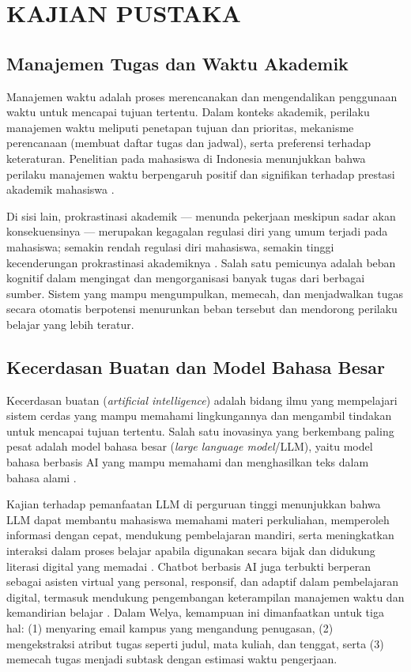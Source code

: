 \chapter{KAJIAN PUSTAKA}

\section{Manajemen Tugas dan Waktu Akademik}
Manajemen waktu adalah proses merencanakan dan mengendalikan penggunaan
waktu untuk mencapai tujuan tertentu. Dalam konteks akademik, perilaku
manajemen waktu meliputi penetapan tujuan dan prioritas, mekanisme
perencanaan (membuat daftar tugas dan jadwal), serta preferensi terhadap
keteraturan. Penelitian pada mahasiswa di Indonesia menunjukkan bahwa
perilaku manajemen waktu berpengaruh positif dan signifikan terhadap
prestasi akademik mahasiswa \parencite{kamilatunnisa2025}.

Di sisi lain, prokrastinasi akademik --- menunda pekerjaan meskipun sadar
akan konsekuensinya --- merupakan kegagalan regulasi diri yang umum
terjadi pada mahasiswa; semakin rendah regulasi diri mahasiswa, semakin
tinggi kecenderungan prokrastinasi akademiknya \parencite{fadila2024}. Salah
satu pemicunya adalah beban kognitif dalam
mengingat dan mengorganisasi banyak tugas dari berbagai sumber. Sistem
yang mampu mengumpulkan, memecah, dan menjadwalkan tugas secara otomatis
berpotensi menurunkan beban tersebut dan mendorong perilaku belajar yang
lebih teratur.

\section{Kecerdasan Buatan dan Model Bahasa Besar}
Kecerdasan buatan (\emph{artificial intelligence}) adalah bidang ilmu yang
mempelajari sistem cerdas yang mampu memahami lingkungannya dan mengambil
tindakan untuk mencapai tujuan tertentu. Salah satu inovasinya yang
berkembang paling pesat adalah model bahasa besar (\emph{large language
model}/LLM), yaitu model bahasa berbasis AI yang mampu memahami dan
menghasilkan teks dalam bahasa alami \parencite{johan2026}.

Kajian terhadap pemanfaatan LLM di perguruan tinggi menunjukkan bahwa LLM
dapat membantu mahasiswa memahami materi perkuliahan, memperoleh
informasi dengan cepat, mendukung pembelajaran mandiri, serta
meningkatkan interaksi dalam proses belajar apabila digunakan secara
bijak dan didukung literasi digital yang memadai \parencite{johan2026}.
Chatbot berbasis AI juga terbukti berperan sebagai asisten virtual yang
personal, responsif, dan adaptif dalam pembelajaran digital, termasuk
mendukung pengembangan keterampilan manajemen waktu dan kemandirian
belajar \parencite{hidayah2025}.
Dalam Welya, kemampuan ini dimanfaatkan untuk tiga hal: (1) menyaring
email kampus yang mengandung penugasan, (2) mengekstraksi atribut tugas
seperti judul, mata kuliah, dan tenggat, serta (3) memecah tugas menjadi
subtask dengan estimasi waktu pengerjaan.

